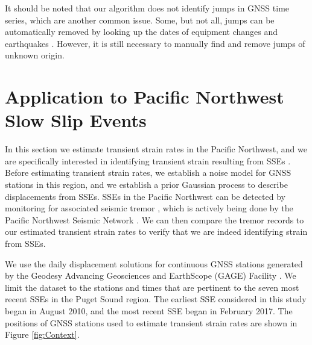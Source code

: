 \documentclass[extra,mreferee]{gji}
\begin{document}

It should be noted that our algorithm does not identify jumps in GNSS
time series, which are another common issue. Some, but not all, jumps
can be automatically removed by looking up the dates of equipment
changes and earthquakes \citep{Gazeaux2013}. However, it is still
necessary to manually find and remove jumps of unknown origin.


\section{Application to Pacific Northwest Slow Slip Events}\label{sec:Cascadia}


In this section we estimate transient strain rates in the Pacific
Northwest, and we are specifically interested in identifying transient
strain resulting from SSEs \citep[e.g.,][]{Dragert2001}. Before
estimating transient strain rates, we establish a noise model for GNSS
stations in this region, and we establish a prior Gaussian process to
describe displacements from SSEs. SSEs in the Pacific Northwest can be
detected by monitoring for associated seismic tremor
\citep{Rogers2003}, which is actively being done by the Pacific
Northwest Seismic Network \citep{Wech2010}. We can then compare the
tremor records to our estimated transient strain rates to verify that
we are indeed identifying strain from SSEs.


We use the daily displacement solutions for continuous GNSS stations
generated by the Geodesy Advancing Geosciences and EarthScope (GAGE)
Facility \citep{Herring2016}. We limit the dataset to the stations and
times that are pertinent to the seven most recent SSEs in the Puget
Sound region. The earliest SSE considered in this study began in
August 2010, and the most recent SSE began in February 2017. The
positions of GNSS stations used to estimate transient strain rates are
shown in Figure \ref{fig:Context}.
\end{document}
